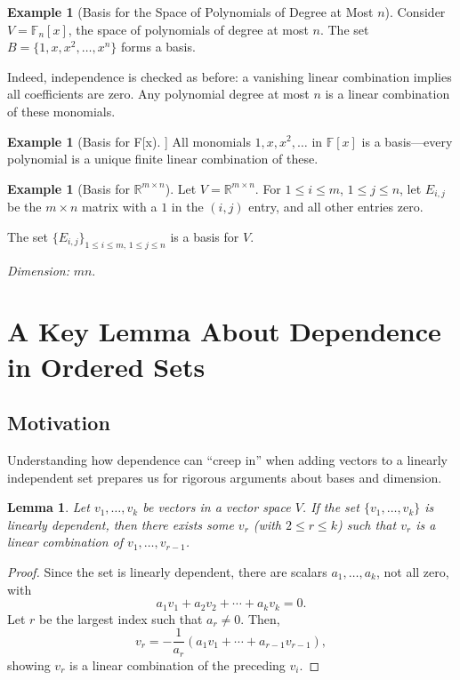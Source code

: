 \documentclass[11pt]{article}
\theoremstyle{definition}
\newtheorem{example}[definition]{Example}
\theoremstyle{plain}
\newtheorem{lemma}[definition]{Lemma}
\begin{document}
\begin{example}[Basis for the Space of Polynomials of Degree at Most $n$]
Consider $V = \mathbb{F}_{n}[x]$, the space of polynomials of degree at most $n$. The set $B = \{1, x, x^2, \dots, x^{n}\}$ forms a basis.

Indeed, independence is checked as before: a vanishing linear combination implies all coefficients are zero. Any polynomial degree at most $n$ is a linear combination of these monomials.
\end{example}

\begin{example}[Basis for F[x]]
All monomials $1, x, x^2, \ldots$ in $\mathbb{F}[x]$ is a basis—every polynomial is a unique finite linear combination of these.
\end{example}

\begin{example}[Basis for $\mathbb{R}^{m \times n}$]
Let $V = \mathbb{R}^{m \times n}$. For $1 \leq i \leq m$, $1 \leq j \leq n$, let $E_{i,j}$ be the $m\times n$ matrix with a $1$ in the $(i, j)$ entry, and all other entries zero.

The set $\{E_{i,j}\}_{1 \leq i \leq m,\, 1 \leq j \leq n}$ is a basis for $V$.

\emph{Dimension:} $mn$.
\end{example}

\section{A Key Lemma About Dependence in Ordered Sets}

\subsection{Motivation}
Understanding how dependence can ``creep in'' when adding vectors to a linearly independent set prepares us for rigorous arguments about bases and dimension.

\begin{lemma}
Let $v_1, \dots, v_k$ be vectors in a vector space $V$. If the set $\{v_1, \dots, v_k\}$ is linearly dependent, then there exists some $v_r$ (with $2 \leq r \leq k$) such that $v_r$ is a linear combination of $v_1,\dots,v_{r-1}$.
\end{lemma}

\begin{proof}
Since the set is linearly dependent, there are scalars $a_1,\dots, a_k$, not all zero, with
\[
a_1 v_1 + a_2 v_2 + \cdots + a_k v_k = 0.
\]
Let $r$ be the largest index such that $a_r \neq 0$. Then,
\[
v_r = -\frac{1}{a_r}(a_1v_1 + \cdots + a_{r-1}v_{r-1}),
\]
showing $v_r$ is a linear combination of the preceding $v_i$.
\end{proof}
\end{document}
